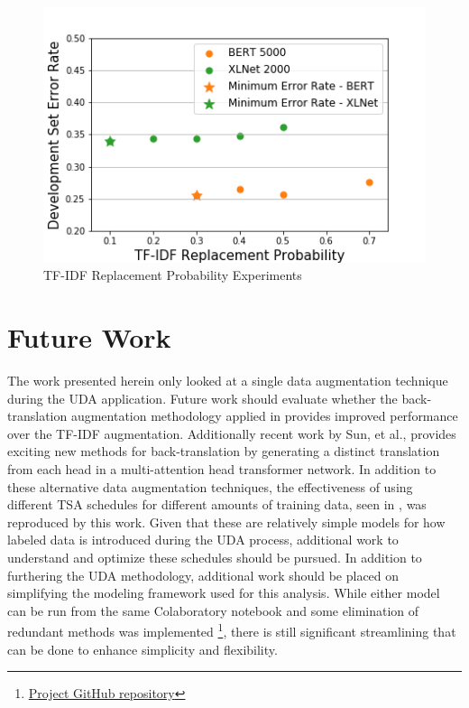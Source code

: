 \documentclass[twoside,twocolumn,10pt]{article}
\begin{document}
\begin{figure}
	\includegraphics[width=\linewidth]{tfidf.png}
	\caption{TF-IDF Replacement Probability Experiments}
	\label{fig:tfidf}
\end{figure}

\section{Future Work} \label{future}
The work presented herein only looked at a single data augmentation technique during the UDA application. Future work should evaluate whether the back-translation augmentation methodology applied in \cite{Xie:2019} provides improved performance over the TF-IDF augmentation. Additionally recent work by Sun, et al., \cite{Sun:2019} provides exciting new methods for back-translation by generating a distinct translation from each head in a multi-attention head transformer network. In addition to these alternative data augmentation techniques, the effectiveness of using different TSA schedules for different amounts of training data, seen in \cite{Xie:2019}, was reproduced by this work. Given that these are relatively simple models for how labeled data is introduced during the UDA process, additional work to understand and optimize these schedules should be pursued. In addition to furthering the UDA methodology, additional work should be placed on simplifying the modeling framework used for this analysis. While either model can be run from the same Colaboratory notebook and some elimination of redundant methods was implemented \footnote{ \href{https://github.com/tomgoter/nlp_finalproject}{Project GitHub repository}}, there is still significant streamlining that can be done to enhance simplicity and flexibility.
\end{document}
